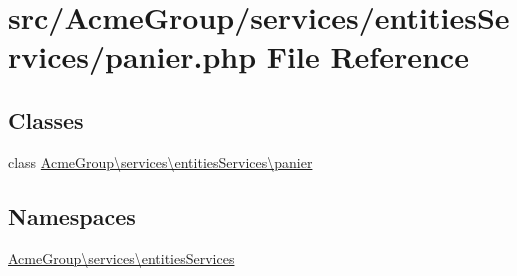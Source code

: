 \hypertarget{services_2entities_services_2panier_8php}{\section{src/\+Acme\+Group/services/entities\+Services/panier.php File Reference}
\label{services_2entities_services_2panier_8php}
}
\subsection*{Classes}
\begin{DoxyCompactItemize}
\item 
class \hyperlink{class_acme_group_1_1services_1_1entities_services_1_1panier}{Acme\+Group\textbackslash{}services\textbackslash{}entities\+Services\textbackslash{}panier}
\end{DoxyCompactItemize}
\subsection*{Namespaces}
\begin{DoxyCompactItemize}
\item 
 \hyperlink{namespace_acme_group_1_1services_1_1entities_services}{Acme\+Group\textbackslash{}services\textbackslash{}entities\+Services}
\end{DoxyCompactItemize}
